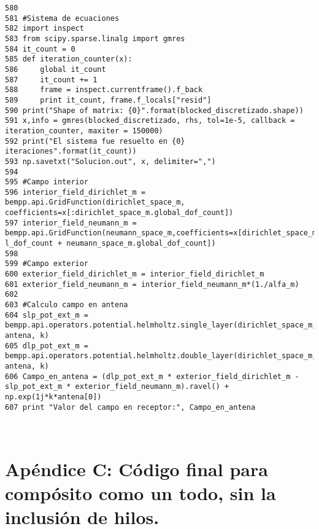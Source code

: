 \documentclass[12pt,letterpaper]{report}
\numberwithin{equation}{section}
\begin{document}
\begin{lstlisting}
580 
581 #Sistema de ecuaciones
582 import inspect
583 from scipy.sparse.linalg import gmres
584 it_count = 0
585 def iteration_counter(x):
586     global it_count
587     it_count += 1
588     frame = inspect.currentframe().f_back
589     print it_count, frame.f_locals["resid"]
590 print("Shape of matrix: {0}".format(blocked_discretizado.shape))
591 x,info = gmres(blocked_discretizado, rhs, tol=1e-5, callback = iteration_counter, maxiter = 150000)
592 print("El sistema fue resuelto en {0} iteraciones".format(it_count))
593 np.savetxt("Solucion.out", x, delimiter=",")
594 
595 #Campo interior
596 interior_field_dirichlet_m = bempp.api.GridFunction(dirichlet_space_m, coefficients=x[:dirichlet_space_m.global_dof_count])
597 interior_field_neumann_m = bempp.api.GridFunction(neumann_space_m,coefficients=x[dirichlet_space_m.global_dof_count:dirichlet_space_m.globa    l_dof_count + neumann_space_m.global_dof_count])
598 
599 #Campo exterior
600 exterior_field_dirichlet_m = interior_field_dirichlet_m
601 exterior_field_neumann_m = interior_field_neumann_m*(1./alfa_m)
602 
603 #Calculo campo en antena
604 slp_pot_ext_m = bempp.api.operators.potential.helmholtz.single_layer(dirichlet_space_m, antena, k)
605 dlp_pot_ext_m = bempp.api.operators.potential.helmholtz.double_layer(dirichlet_space_m, antena, k)
606 Campo_en_antena = (dlp_pot_ext_m * exterior_field_dirichlet_m - slp_pot_ext_m * exterior_field_neumann_m).ravel() + np.exp(1j*k*antena[0])
607 print "Valor del campo en receptor:", Campo_en_antena



\end{lstlisting}

\pagebreak

\part*{Apéndice C: Código final para compósito como un todo, sin la inclusión de hilos.}
\end{document}
